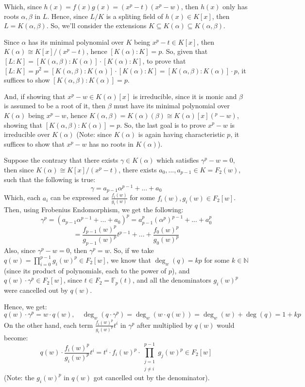\documentclass{article}
\begin{document}
\begin{itemize}
    Which, since $h(x)=f(x)g(x)=(x^p-t)(x^p-w)$, then $h(x)$ only has roots $\alpha,\beta$ in $L$. Hence, since $L/K$ is a spliting field of $h(x)\in K[x]$, then $L=K(\alpha,\beta)$. So, we'll consider the extensions $K\subseteq K(\alpha)\subseteq K(\alpha,\beta)$.

    \hfil

    Since $\alpha$ has its minimal polynomial over $K$ being $x^p-t\in K[x]$, then $K(\alpha)\cong K[x]/(x^p-t)$, hence $[K(\alpha):K]=p$.
    So, given that $[L:K]=[K(\alpha,\beta):K(\alpha)]\cdot [K(\alpha):K]$, to prove that $[L:K]=p^2 = [K(\alpha,\beta):K(\alpha)]\cdot [K(\alpha):K] = [K(\alpha,\beta):K(\alpha)]\cdot p$, it suffices to show $[K(\alpha,\beta):K(\alpha)] = p$. 
    
    And, if showing that $x^p-w\in K(\alpha)[x]$ is irreducible, since it is monic and $\beta$ is assumed to be a root of it, then $\beta$ must have its minimal polynomial over $K(\alpha)$ being $x^p-w$, hence $K(\alpha,\beta) = K(\alpha)(\beta)\cong K(\alpha)[x](^p-w)$, showing that $[K(\alpha,\beta):K(\alpha)]=p$. So, the last goal is to prove $x^p-w$ is irreducible over $K(\alpha)$ (Note: since $K(\alpha)$ is again having characteristic $p$, it suffices to show that $x^p-w$ has no roots in $K(\alpha)$).

    \hfil

    Suppose the contrary that there exists $\gamma\in K(\alpha)$ which satisfies $\gamma^p-w = 0$, then since $K(\alpha)\cong K[x]/(x^p-t)$, there exists $a_0,...,a_{p-1}\in K = F_2(w)$, such that the following is true:
    $$\gamma = a_{p-1}\alpha^{p-1}+...+a_0$$
    Which, each $a_i$ can be expressed as $\frac{f_i(w)}{g_i(w)}$ for some $f_i(w), g_i(w)\in F_2[w]$. Then, using Frobenius Endomorphism, we get the following:
    $$\gamma^p = (a_{p-1}\alpha^{p-1}+...+a_0)^p = a_{p-1}^p(\alpha^p)^{p-1} + ... + a_0^p$$
    $$ = \frac{f_{p-1}(w)^p}{g_{p-1}(w)^p}t^{p-1}+...+\frac{f_0(w)^p}{g_0(w)^p}$$
    Also, since $\gamma^p-w = 0$, then $\gamma^p=w$. So, if we take $q(w) = \prod_{i=0}^{p-1}g_i(w)^p\in F_2[w]$, we know that $\deg_w(q) = kp$ for some $k\in \mathbb{N}$ (since its product of polynomials, each to the power of $p$), and $q(w)\cdot \gamma^p\in F_2[w]$, since $t\in F_2=\mathbb{F}_p(t)$, and all the denominators $g_i(w)^p$ were cancelled out by $q(w)$.
    
    Hence, we get:
    $$q(w)\cdot \gamma^p = w \cdot q(w),\quad \deg_w(q\cdot \gamma^p) = \deg_w(w\cdot q(w)) =\deg_w(w)+\deg(q)= 1+kp$$
    On the other hand, each term $\frac{f_i(w)^p}{g_i(w)^p}t^i$ in $\gamma^p$ after multiplied by $q(w)$ would become:
    $$q(w)\cdot \frac{f_i(w)^p}{g_i(w)^p}t^i = t^i\cdot f_i(w)^p\cdot \prod_{\substack{j=1\\j\neq i}}^{p-1}g_j(w)^p\in F_2[w]$$
    (Note: the $g_i(w)^p$ in $q(w)$ got cancelled out by the denominator).


\end{itemize}
\end{document}
